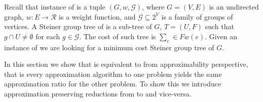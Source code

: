 Recall that instance of \ProbGroup{} is a tuple $(G, w, \mathcal{G})$,
where $G = (V, E)$ is an undirected graph, $w:E \to \mathcal{R}$ is a weight function, 
and $\mathcal{G} \subseteq 2^V$ is a family of groups of vertices.
A Steiner group tree of is a sub-tree of $G$, $T = (U, F)$
such that $g \cap U \neq \emptyset$ for each $g \in \mathcal{G}$.
The cost of such tree is $\sum_e \in F w(e)$.
Given an instance of \ProbGroup{} we are looking for a minimum cost Steiner group tree
of $G$.

In this section we show that \Prob{} is equivalent to \ProbGroup{} from 
approximability perspective, 
that is every approximation algorithm to one problem yields the same approximation 
ratio for the other problem.
To show this we introduce approximation preserving reductions from \Prob{} to \ProbGroup{}
and vice-versa. 


